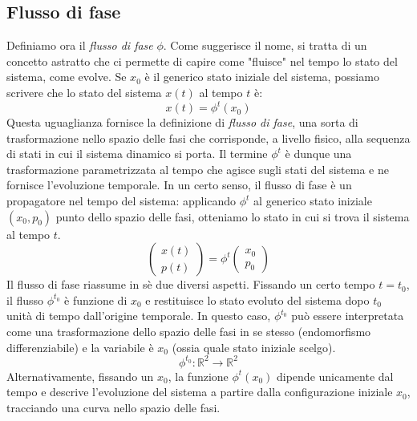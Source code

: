 \documentclass[a4paper,openany]{article}
\begin{document}
	\subsection{Flusso di fase}
	Definiamo ora il \textit{flusso di fase} $\phi$. Come suggerisce il nome, si tratta di un concetto astratto che ci permette di capire come "fluisce" nel tempo lo stato del sistema, come evolve. Se $x_{0}$ è il generico stato iniziale del sistema, possiamo scrivere che lo stato del sistema $x(t)$ al tempo $t$ è:
	$$
	x(t) = \phi^{t}(x_{0})
	$$
	Questa uguaglianza fornisce la definizione di \textit{flusso di fase}, una sorta di trasformazione nello spazio delle fasi che corrisponde, a livello fisico, alla sequenza di stati in cui il sistema dinamico si porta. Il termine $\phi^{t}$ è dunque una trasformazione parametrizzata al tempo che agisce sugli stati del sistema e ne fornisce l'evoluzione temporale.
	In un certo senso, il flusso di fase è un propagatore nel tempo del sistema: applicando $\phi^{t}$ al generico stato iniziale $(x_{0},p_{0})$ punto dello spazio delle fasi, otteniamo lo stato in cui si trova il sistema al tempo $t$.
	\begin{equation}
		\begin{pmatrix}
			x(t) \\
			p(t)
		\end{pmatrix} 
		=
		\phi^{t}
		\begin{pmatrix}
			x_{0} \\
			p_{0}
		\end{pmatrix}
	\end{equation}
	Il flusso di fase riassume in sè due diversi aspetti. Fissando un certo tempo $t=t_{0}$, il flusso $\phi^{t_{0}}$ è funzione di $x_{0}$ e restituisce lo stato evoluto del sistema dopo $t_{0}$ unità di tempo dall'origine temporale. In questo caso, $\phi^{t_{0}}$ può essere interpretata come una trasformazione dello spazio delle fasi in se stesso (endomorfismo differenziabile) e la variabile è $x_{0}$ (ossia quale stato iniziale scelgo).
	$$
	\phi^{t_0} : \mathbb{R}^{2}\rightarrow\mathbb{R}^{2}
	$$
	Alternativamente, fissando un $x_{0}$, la funzione $\phi^{t}(x_{0})$ dipende unicamente dal tempo e descrive l'evoluzione del sistema a partire dalla configurazione iniziale $x_{0}$, tracciando una curva nello spazio delle fasi.
\end{document}
